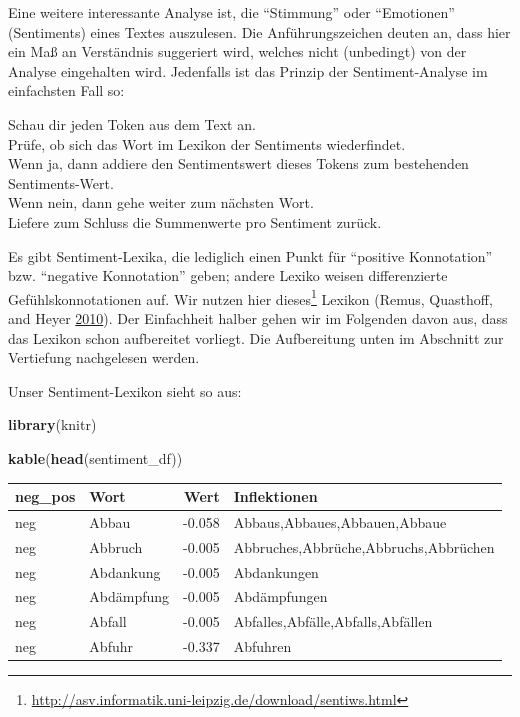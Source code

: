 \documentclass[12pt,]{book}
\makeatletter
\newenvironment{Shaded}{\begin{snugshade}}{\end{snugshade}}
\newcommand{\KeywordTok}[1]{\textcolor[rgb]{0.13,0.29,0.53}{\textbf{{#1}}}}
\newcommand{\NormalTok}[1]{{#1}}
\renewcommand{\href}[2]{#2\footnote{\url{#1}}}
\newenvironment{kframe}{%
\medskip{}
\setlength{\fboxsep}{.8em}
 \def\at@end@of@kframe{}%
 \ifinner\ifhmode%
  \def\at@end@of@kframe{\end{minipage}}%
  \begin{minipage}{\columnwidth}%
 \fi\fi%
 \def\FrameCommand##1{\hskip\@totalleftmargin \hskip-\fboxsep
 \colorbox{shadecolor}{##1}\hskip-\fboxsep
     \hskip-\linewidth \hskip-\@totalleftmargin \hskip\columnwidth}%
 \MakeFramed {\advance\hsize-\width
   \@totalleftmargin\z@ \linewidth\hsize
   \@setminipage}}%
 {\par\unskip\endMakeFramed%
 \at@end@of@kframe}
\renewenvironment{Shaded}{\begin{kframe}}{\end{kframe}}
\let\BeginKnitrBlock\begin \let\EndKnitrBlock\end
\makeatother
\begin{document}
Eine weitere interessante Analyse ist, die ``Stimmung'' oder
``Emotionen'' (Sentiments) eines Textes auszulesen. Die
Anführungszeichen deuten an, dass hier ein Maß an Verständnis suggeriert
wird, welches nicht (unbedingt) von der Analyse eingehalten wird.
Jedenfalls ist das Prinzip der Sentiment-Analyse im einfachsten Fall so:

\BeginKnitrBlock{rmdpseudocode}
Schau dir jeden Token aus dem Text an.\\
Prüfe, ob sich das Wort im Lexikon der Sentiments wiederfindet.\\
Wenn ja, dann addiere den Sentimentswert dieses Tokens zum bestehenden
Sentiments-Wert.\\
Wenn nein, dann gehe weiter zum nächsten Wort.\\
Liefere zum Schluss die Summenwerte pro Sentiment zurück.
\EndKnitrBlock{rmdpseudocode}

Es gibt Sentiment-Lexika, die lediglich einen Punkt für ``positive
Konnotation'' bzw. ``negative Konnotation'' geben; andere Lexiko weisen
differenzierte Gefühlskonnotationen auf. Wir nutzen hier
\href{http://asv.informatik.uni-leipzig.de/download/sentiws.html}{dieses}
Lexikon (Remus, Quasthoff, and Heyer
\protect\hyperlink{ref-remquahey2010}{2010}). Der Einfachheit halber
gehen wir im Folgenden davon aus, dass das Lexikon schon aufbereitet
vorliegt. Die Aufbereitung unten im Abschnitt zur Vertiefung nachgelesen
werden.

Unser Sentiment-Lexikon sieht so aus:

\begin{Shaded}
\begin{Highlighting}[]
\KeywordTok{library}\NormalTok{(knitr)}

\KeywordTok{kable}\NormalTok{(}\KeywordTok{head}\NormalTok{(sentiment_df))}
\end{Highlighting}
\end{Shaded}

\begin{tabular}{l|l|r|l}
\hline
neg\_pos & Wort & Wert & Inflektionen\\
\hline
neg & Abbau & -0.058 & Abbaus,Abbaues,Abbauen,Abbaue\\
\hline
neg & Abbruch & -0.005 & Abbruches,Abbrüche,Abbruchs,Abbrüchen\\
\hline
neg & Abdankung & -0.005 & Abdankungen\\
\hline
neg & Abdämpfung & -0.005 & Abdämpfungen\\
\hline
neg & Abfall & -0.005 & Abfalles,Abfälle,Abfalls,Abfällen\\
\hline
neg & Abfuhr & -0.337 & Abfuhren\\
\hline
\end{tabular}
\end{document}

